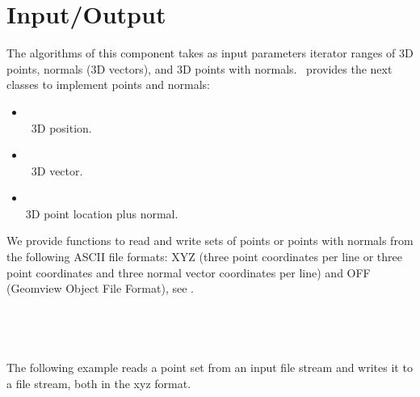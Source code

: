 \section{Input/Output}

The algorithms of this component takes as input parameters iterator ranges of 3D points, normals (3D vectors), and 3D points with normals. \cgal\ provides the next classes to implement points and normals:

\begin{itemize}
\item {} \\
\cgal\ 3D position.
\item {} \\
\cgal\ 3D vector.
\item {} \\
3D point location plus normal.
\end{itemize}

We provide functions to read and write sets of points or points with normals from the following ASCII file formats: XYZ (three point coordinates  per line or three point coordinates and three normal vector coordinates  per line) and OFF (Geomview Object File Format), see \cite{cgal-off-format}. %
\\
  \\
  \\
  \\
  \\

The following example reads a point set from an input file stream and writes it to a file stream, both in the xyz format.
